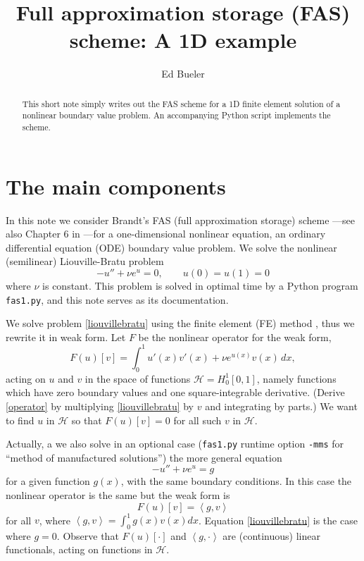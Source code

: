 \documentclass[letterpaper,final,12pt,reqno]{amsart}
\newcommand{\ip}[2]{\left<#1,#2\right>}
\begin{document}
\title[Full approximation storage (FAS) scheme]{Full approximation storage (FAS) scheme: A 1D example}

\author{Ed Bueler}

\begin{abstract}  This short note simply writes out the FAS scheme for a 1D finite element solution of a nonlinear boundary value problem.  An accompanying Python script implements the scheme.
\end{abstract}

\maketitle

\thispagestyle{empty}
\bigskip

\section{The main components}

In this note we consider Brandt's FAS (full approximation storage) scheme \cite{Brandt1977}---see also Chapter 6 in \cite{Briggsetal2000}---for a one-dimensional nonlinear equation, an ordinary differential equation (ODE) boundary value problem.  We solve the nonlinear (semilinear) Liouville-Bratu problem \cite[for example]{Bueler2021}
\begin{equation}
  -u'' + \nu e^u = 0,  \qquad u(0) = u(1) = 0  \label{liouvillebratu}
\end{equation}
where $\nu$ is constant.  This problem is solved in optimal time by a Python program \texttt{fas1.py}, and this note serves as its documentation.

We solve problem \eqref{liouvillebratu} using the finite element (FE) method \cite{Bueler2021,Elmanetal2014}, thus we rewrite it in weak form.  Let $F$ be the nonlinear operator for the weak form,
\begin{equation}
  F(u)[v] = \int_0^1 u'(x) v'(x) + \nu e^{u(x)} v(x)\, dx,  \label{operator}
\end{equation}
acting on $u$ and $v$ in the space of functions $\mathcal{H}=H_0^1[0,1]$, namely functions which have zero boundary values and one square-integrable derivative.  (Derive \eqref{operator} by multiplying \eqref{liouvillebratu} by $v$ and integrating by parts.)  We want to find $u$ in $\mathcal{H}$ so that $F(u)[v] = 0$ for all such $v$ in $\mathcal{H}$.

Actually, a we also solve in an optional case (\texttt{fas1.py} runtime option \texttt{-mms} for ``method of manufactured solutions'') the more general equation
  $$-u'' + \nu e^u = g$$
for a given function $g(x)$, with the same boundary conditions.  In this case the nonlinear operator is the same but the weak form is
\begin{equation}
  F(u)[v] = \ip{g}{v} \label{weakform}
\end{equation}
for all $v$, where $\ip{g}{v} = \int_0^1 g(x) v(x) dx$.  Equation \eqref{liouvillebratu} is the case where $g=0$.  Observe that $F(u)[\cdot]$ and $\ip{g}{\cdot}$ are (continuous) linear functionals, acting on functions in $\mathcal{H}$.
\end{document}
